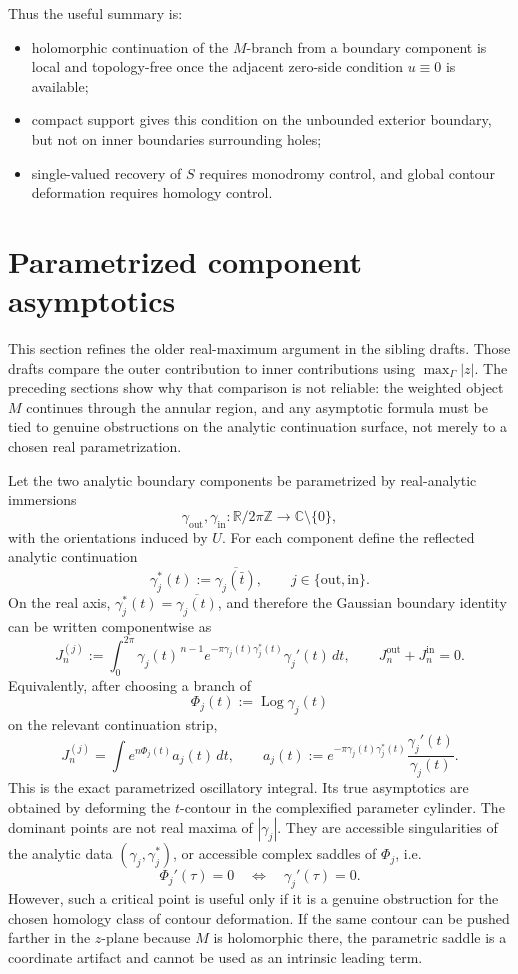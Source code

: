 \documentclass[11pt]{article}
\newcommand{\C}{\mathbb C}
\newcommand{\R}{\mathbb R}
\newcommand{\dd}{\,d}
\newcommand{\1}{\mathbf 1}
\newcommand{\Log}{\operatorname{Log}}
\begin{document}
Thus the useful summary is:
\begin{itemize}
\item holomorphic continuation of the \(M\)-branch from a boundary component is local and
topology-free once the adjacent zero-side condition \(u\equiv0\) is available;
\item compact support gives this condition on the unbounded exterior boundary, but not on
inner boundaries surrounding holes;
\item single-valued recovery of \(S\) requires monodromy control, and global contour
deformation requires homology control.
\end{itemize}

\section{Parametrized component asymptotics}

This section refines the older real-maximum argument in the sibling drafts. Those drafts
compare the outer contribution to inner contributions using \(\max_\Gamma |z|\). The
preceding sections show why that comparison is not reliable: the weighted object \(M\)
continues through the annular region, and any asymptotic formula must be tied to genuine
obstructions on the analytic continuation surface, not merely to a chosen real
parametrization.

Let the two analytic boundary components be parametrized by real-analytic immersions
\[
  \gamma_{\mathrm{out}},\gamma_{\mathrm{in}}:\R/2\pi\mathbb Z\to\C\setminus\{0\},
\]
with the orientations induced by \(U\). For each component define the reflected analytic
continuation
\[
  \gamma_j^*(t):=\overline{\gamma_j(\bar t)} ,
  \qquad j\in\{\mathrm{out},\mathrm{in}\}.
\]
On the real axis, \(\gamma_j^*(t)=\overline{\gamma_j(t)}\), and therefore the Gaussian
boundary identity can be written componentwise as
\begin{equation}\label{eq:param-J}
  J_n^{(j)}
  :=
  \int_0^{2\pi}
  \gamma_j(t)^{\,n-1}
  e^{-\pi\gamma_j(t)\gamma_j^*(t)}
  \gamma_j'(t)\dd t,
  \qquad
  J_n^{\mathrm{out}}+J_n^{\mathrm{in}}=0.
\end{equation}
Equivalently, after choosing a branch of
\[
  \Phi_j(t):=\Log\gamma_j(t)
\]
on the relevant continuation strip,
\[
  J_n^{(j)}
  =
  \int e^{n\Phi_j(t)}a_j(t)\dd t,
  \qquad
  a_j(t):=
  e^{-\pi\gamma_j(t)\gamma_j^*(t)}
  \frac{\gamma_j'(t)}{\gamma_j(t)}.
\]
This is the exact parametrized oscillatory integral. Its true asymptotics are obtained by
deforming the \(t\)-contour in the complexified parameter cylinder. The dominant points
are not real maxima of \(|\gamma_j|\). They are accessible singularities of the analytic
data \((\gamma_j,\gamma_j^*)\), or accessible complex saddles of \(\Phi_j\), i.e.
\[
  \Phi_j'(\tau)=0
  \quad\Longleftrightarrow\quad
  \gamma_j'(\tau)=0.
\]
However, such a critical point is useful only if it is a genuine obstruction for the chosen
homology class of contour deformation. If the same contour can be pushed farther in the
\(z\)-plane because \(M\) is holomorphic there, the parametric saddle is a coordinate
artifact and cannot be used as an intrinsic leading term.
\end{document}
